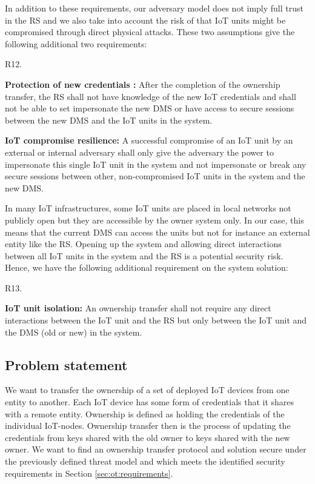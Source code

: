 {In addition to these requirements, our adversary model does not imply full trust in the RS and we also take into account the risk of that IoT units might be compromised through direct physical attacks. These two assumptions give the following additional two requirements:

\begin{labeling}{R12.}
\item [R11.] \textbf{Protection of new credentials :} After the completion of the ownership transfer, the RS shall not have knowledge of the new IoT credentials and shall not be able to set impersonate the new DMS or have access to secure sessions between the new DMS and the IoT units in the system.
\item [R12.] \textbf{IoT compromise resilience:} A successful compromise of an IoT unit by an external or internal adversary shall only give the adversary the power to impersonate this single IoT unit in the system and not impersonate or break any secure sessions between other, non-compromised IoT units in the system and the new DMS.
\end{labeling}

In many IoT infrastructures, some IoT units are placed in local networks not publicly open but they are accessible by the owner system only. In our case, this means that the current DMS can access the units but not for instance an external entity like the RS. Opening up the system and allowing direct interactions between all IoT units in the system and the RS is a potential security risk. Hence, we have the following additional requirement on the system solution:

\begin{labeling}{R13.}
\item [R13.] \textbf{IoT unit isolation:} An ownership transfer shall not require any direct interactions between the IoT unit and the RS but only between the IoT unit and the DMS (old or new) in the system.
\end{labeling}
\subsection{Problem statement}
\label{sec:ot:problem}
We want to transfer the ownership of a set of deployed IoT devices from one entity to another. Each IoT device has some form of credentials that it shares with a remote entity. Ownership is defined as holding the credentials of the individual IoT-nodes. Ownership transfer then is the process of updating the credentials from keys shared with the old owner to keys shared with the new owner. We want to find an ownership transfer protocol and solution secure under the previously defined threat model and which meets the identified security requirements in Section \ref{sec:ot:requirements}.

}
